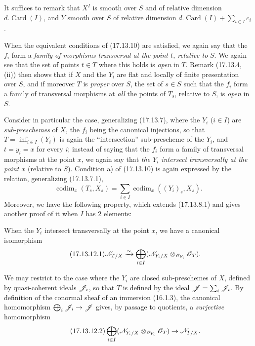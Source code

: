 It suffices to remark that $X^I$ is smooth over $S$ and of relative dimension $d.\operatorname{Card}(I)$, and $Y$ smooth over $S$ of relative dimension $d.\operatorname{Card}(I)+\sum_{i\in I}c_i$.

When the equivalent conditions of (17.13.10) are satisfied, we again say that the $f_i$ form a \emph{family of morphisms transversal at the point $t$, relative to} $S$. We again see that the set of points $t\in T$ where this holds is \emph{open} in $T$. Remark (17.13.4, (ii)) then shows that if $X$ and the $Y_i$ are flat and locally of finite presentation over $S$, and if moreover $T$ is \emph{proper} over $S$, the set of $s\in S$ such that the $f_i$ form a family of transversal morphisms at \emph{all} the points of $T_s$, relative to $S$, is \emph{open} in $S$.

\begin{env}[17.13.11]\label{IV.17.13.11}
Consider in particular the case, generalizing (17.13.7), where the $Y_i$ ($i\in I$) are \emph{sub-preschemes} of $X$, the $f_i$ being the canonical injections, so that $T=\inf_{i\in I}(Y_i)$ is again the ``intersection'' sub-prescheme of the $Y_i$, and $t=y_i=x$ for every $i$; instead of saying that the $f_i$ form a family of transversal morphisms at the point $x$, we again say that \emph{the $Y_i$ intersect transversally at the point $x$} (relative to $S$). Condition a) of (17.13.10) is again expressed by the relation, generalizing (17.13.7.1),
\[
\label{IV.17.13.11.1}
\tag{17.13.11.1}
\operatorname{codim}_x(T_s,X_s)=\sum_{i\in I}\operatorname{codim}_x((Y_i)_s,X_s).
\]
Moreover, we have the following property, which extends (17.13.8.1) and gives another proof of it when $I$ has 2 elements:
\end{env}

\begin{corollary}[17.13.12]
\label{IV.17.13.12}
When the $Y_i$ intersect transversally at the point $x$, we have a canonical isomorphism
\[
\label{IV.17.13.12.1}
\tag{17.13.12.1}
\mathscr{N}_{T/X}\xrightarrow{\sim}\bigoplus_{i\in I}(\mathscr{N}_{Y_i/X}\otimes_{\mathscr{O}_{Y_i}}\mathscr{O}_T).
\]
\end{corollary}

We may restrict to the case where the $Y_i$ are closed sub-preschemes of $X$, defined by quasi-coherent ideals $\mathscr{J}_i$, so that $T$ is defined by the ideal $\mathscr{J}=\sum_i\mathscr{J}_i$. By definition of the conormal sheaf of an immersion (16.1.3), the canonical homomorphism $\bigoplus_i\mathscr{J}_i\to\mathscr{J}$ gives, by passage to quotients, a \emph{surjective} homomorphism
\[
\label{IV.17.13.12.2}
\tag{17.13.12.2}
\bigoplus_{i\in I}(\mathscr{N}_{Y_i/X}\otimes_{\mathscr{O}_{Y_i}}\mathscr{O}_T)\to\mathscr{N}_{T/X}.
\]

